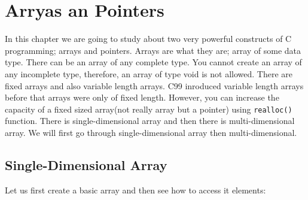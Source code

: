 \chapter{Arryas an Pointers}
In this chapter we are going to study about two very powerful constructs of C
programming; arrays and pointers. Arrays are what they are; array of some data
type. There can be an array of any complete type. You cannot create an array of
any incomplete type, therefore, an array of type void is not allowed. There are
fixed arrays and also variable length arrays. C99 inroduced variable length
arrays before that arrays were only of fixed length. However, you can increase
the capacity of a fixed sized array(not really array but a pointer) using
\texttt{realloc()} function. There is 
single-dimensional array and then there is multi-dimensional array. We will
first go through single-dimensional array then multi-dimensional.

\section{Single-Dimensional Array}
Let us first create a basic array and then see how to access it elements:

